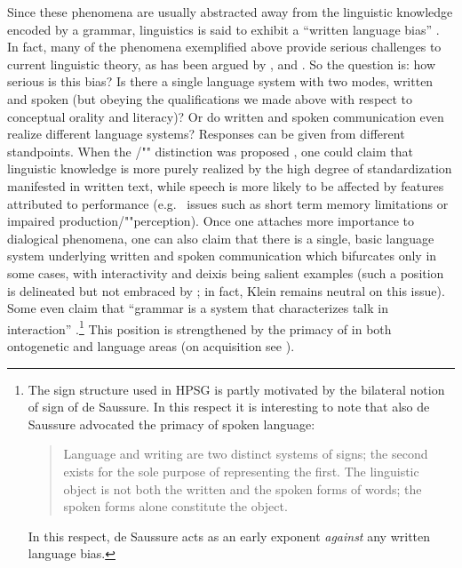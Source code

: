 \documentclass[output=paper,biblatex,babelshorthands,newtxmath,draftmode,colorlinks,citecolor=brown]{langscibook}
\begin{document}
Since these phenomena are usually abstracted away from the linguistic knowledge encoded by a grammar, linguistics is said to exhibit a \enquote{written language bias} \citep{Linell:2005}.
%
In fact, many of the phenomena exemplified above provide serious challenges  to current  linguistic theory, as has been argued by \citet{Ginzburg:2012}, \citet{Ginzburg:Poesio:2016} and \citet{Kempson:Cann:Gregoromichelaki:Chatzikyriakidis:2016}.
%
So the question is: how serious is this bias? 
%
Is there a single language system with two modes, written and spoken (but obeying the qualifications we made above with respect to conceptual orality and literacy)?
%
Or do written and spoken communication even realize different language systems?
%
Responses can be given from different standpoints. 
%
When the /""  distinction was proposed \citep{Chomsky:1969}, one could claim that linguistic knowledge is more purely realized by the high degree of standardization manifested in written text, while speech is more likely to be affected by features attributed to performance (e.g.\   issues such as short term memory limitations or impaired production/""perception).
%
Once one attaches more importance to dialogical phenomena, one can also claim that there is a single, basic language system underlying written and spoken communication which bifurcates only in some cases, with interactivity and deixis being salient examples (such a position is delineated but not embraced by ; in fact, Klein remains neutral on this issue). 
%
Some even claim that \enquote{grammar is a system that characterizes talk in interaction} \citep[]{Ginzburg:Poesio:2016}.\footnote{The sign structure used in HPSG is partly motivated by the bilateral notion of sign of de Saussure. In this respect it is interesting to note that also de Saussure advocated the primacy of spoken language:
\begin{quote}
Language and writing are two distinct systems of signs; the second exists for the sole purpose of
representing the first. The linguistic object is not both the written and the spoken forms of words;
the spoken forms alone constitute the object.  \citep[--24]{Saussure2011a}
\end{quote}
In this respect, de Saussure acts as an early exponent \emph{against} any written language bias.
}
%
This position is strengthened by the primacy of  in both ontogenetic and language  areas (on acquisition see ).
\end{document}
